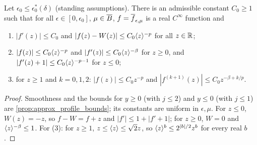 \begin{lemma}
  \label{lem:c06_profile_consequences}
  Let $\epsilon_0\le\epsilon_0^*(\delta)$ (standing assumptions).
  There is an admissible constant $C_0\geq1$ such that for all $\epsilon\in[0,\epsilon_0]$,
  $\mu\in\overline{B}$, $f=\overline{f}_{\epsilon,\mu}$ is a real $C^\infty$ function and
  \begin{enumerate}
    \item $|f'(z)|\leq C_0$ and $|f(z)-W(z)|\leq C_0\langle z \rangle^{-p}$ for all $z\in\mathbb{R}$;
    \item $|f(z)|\leq C_0\langle z \rangle^{-p}$ and $|f'(z)|\le C_0\langle z \rangle^{-\beta}$ for $z\geq0$, and $|f'(z)+1|\leq C_0\langle z \rangle^{-p-1}$ for $z\leq0$;
    \item for $z\geq1$ and $k=0,1,2$: $|f(z)|\le C_0z^{-p}$ and $|f^{(k+1)}(z)|\leq C_0z^{-\beta+k/p}$.
  \end{enumerate}
\end{lemma}
\begin{proof}
  Smoothness and the bounds for $y\geq0$ (with $j\le2$) and $y\le0$ (with $j\le1$) are
  \cref{prop:approx_profile_bounds}; its constants are uniform in $\epsilon,\mu$.
  For $z\le0$, $W(z)=-z$, so $f-W=f+z$ and $|f'|\le1+|f'+1|$; for $z\ge0$, $W=0$ and $\langle z \rangle^{-\beta}\le1$.
  For (3): for $z\geq1$, $z\leq\langle z \rangle\leq\sqrt2 z$, so $\langle z \rangle^{b}\le 2^{|b|/2}z^{b}$ for every real $b$.
\end{proof}

